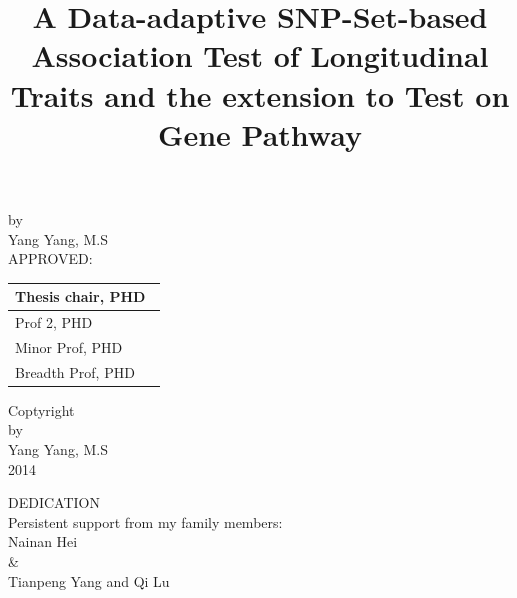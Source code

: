 \documentclass[12pt]{article}
\begin{document}
%
\begin{titlepage}
\title{\normalsize A Data-adaptive SNP-Set-based Association Test of Longitudinal Traits and the extension to Test on Gene Pathway  }
\date{}
\maketitle

{\normalsize
\begin{center}
by\\[5mm]
Yang Yang, M.S\\[10mm]
APPROVED:\\[10mm]
\end{center}}

\begin{table}[h]
\begin{flushright}
\begin{tabular}{ p{8cm}}

\hline
Thesis chair, PHD\ \\[0.8cm]
\hline
Prof 2, PHD\\[0.8cm]
\hline
Minor Prof, PHD\\[0.8cm]
\hline
Breadth Prof, PHD\\[0.8cm]


\end{tabular}
\end{flushright}
\label{default}
\end{table}

\thispagestyle{empty}
\pagestyle{empty}
\end{titlepage}

\newpage
\thispagestyle{empty}
\begin{center}
Coptyright\\
by\\
Yang Yang, M.S\\
2014
\end{center}


\newpage
\thispagestyle{empty}
\doublespacing
\begin{center}
DEDICATION\\
Persistent support from my family members:\\
Nainan Hei\\
\&\\
Tianpeng Yang and Qi Lu
\end{center}
\end{document}
